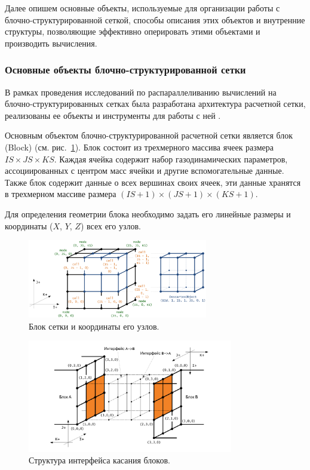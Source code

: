 Далее опишем основные объекты, используемые для организации работы с блочно-структурированной сеткой, способы описания этих объектов и внутренние структуры, позволяющие эффективно оперировать этими объектами и производить вычисления.

\subsubsection{Основные объекты блочно-структурированной сетки}

В рамках проведения исследований по распараллеливанию вычислений на блочно-структурированных сетках была разработана архитектура расчетной сетки, реализованы ее объекты и инструменты для работы с ней \cite{CertRybakov2020PrepStruct}.

Основным объектом блочно-структурированной расчетной сетки является блок (Block) (см. рис.~\ref{fig:text_2_block_block_and_coords}). 
Блок состоит из трехмерного массива ячеек размера $IS \times JS \times KS$.
Каждая ячейка содержит набор газодинамических параметров, ассоциированных с центром масс ячейки и другие вспомогательные данные.
Также блок содержит данные о всех вершинах своих ячеек, эти данные хранятся в трехмерном массиве размера $(IS + 1) \times (JS + 1) \times (KS + 1)$.

Для определения геометрии блока необходимо задать его линейные размеры и координаты ($X$, $Y$, $Z$) всех его узлов.

\begin{figure}[ht]
\centering
\includegraphics[width=0.7\textwidth]{./pics/text_2_block/6-block-and-coords.png}
\singlespacing
{}\caption{Блок сетки и координаты его узлов.}
\label{fig:text_2_block_block_and_coords}
\end{figure}

\begin{figure}[ht]
\centering
\includegraphics[width=0.8\textwidth]{./pics/text_2_block/7-iface.pdf}
\singlespacing
{}\caption{Структура интерфейса касания блоков.}
\label{fig:text_2_block_iface}
\end{figure}

